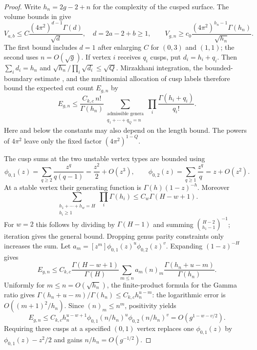 \begin{proof}
Write $h_n=2g-2+n$ for the complexity of the cusped surface. The volume bounds in \cite[Lemmas~18--19]{SW} give
\[
 V_{a,b}\le C\frac{(4\pi^2)^{d-1}\Gamma(d)}{\sqrt d},
 \quad d=2a-2+b\ge1,\qquad
 V_{g,n}\ge c_0\frac{(4\pi^2)^{h_n-1}\Gamma(h_n)}{\sqrt{h_n}}.
\]
The first bound includes $d=1$ after enlarging $C$ for $(0,3)$ and
$(1,1)$; the second uses $n=O(\sqrt g)$. If vertex $i$ receives
$q_i$ cusps, put $d_i=h_i+q_i$. Then $\sum_i d_i=h_n$ and
$\sqrt{h_n}/\prod_i\sqrt{d_i}\le\sqrt Q$. Mirzakhani integration,
the bounded-boundary estimate \cite[Lemma~3.2]{Mir}, and the
multinomial allocation of cusp labels therefore bound the expected
cut count $E_{g,n}$ by
\[
 E_{g,n}\le\frac{C_{k,c}\,n!}{\Gamma(h_n)}
       \sum_{\substack{\text{admissible genera}\\q_1+\cdots+q_Q=n}}
       \prod_i\frac{\Gamma(h_i+q_i)}{q_i!}.
\]
Here and below the constants may also depend on the length bound.
The powers of $4\pi^2$ leave only the fixed factor $(4\pi^2)^{1-Q}$.

The cusp sums at the two unstable vertex types are bounded using
\begin{equation}
 \phi_{0,1}(z)=\sum_{q\ge2}\frac{z^q}{q(q-1)}=\frac{z^2}{2}+O(z^3),
 \qquad \phi_{0,2}(z)=\sum_{q\ge1}\frac{z^q}{q}=z+O(z^2).
 \label{eq:cluster-unstable}
\end{equation}
At a stable vertex their generating function is
$\Gamma(h)(1-z)^{-h}$. Moreover
\[
 \sum_{\substack{h_1+\cdots+h_w=H\\h_i\ge1}}
       \prod_i\Gamma(h_i)\le C_w\Gamma(H-w+1).
\]
For $w=2$ this follows by dividing by $\Gamma(H-1)$ and summing
$\binom{H-2}{h_1-1}^{-1}$; iteration gives the general bound.
Dropping genus parity constraints only increases the sum.
Let $a_m=[z^m]\phi_{0,1}(z)^u\phi_{0,2}(z)^v$. Expanding $(1-z)^{-H}$ gives
\[
 E_{g,n}\le C_{k,c}\frac{\Gamma(H-w+1)}{\Gamma(H)}
       \sum_{m\le n}a_m(n)_m\frac{\Gamma(h_n+u-m)}{\Gamma(h_n)}.
\]
Uniformly for $m\le n=O(\sqrt{h_n})$, the finite-product formula for
the Gamma ratio gives
$\Gamma(h_n+u-m)/\Gamma(h_n)\le C_{k,c}h_n^{u-m}$: the logarithmic
error is $O((m+1)^2/h_n)$. Since $(n)_m\le n^m$, positivity yields
\begin{equation}
 E_{g,n}\le C_{k,c}h_n^{u-w+1}\phi_{0,1}(n/h_n)^u\phi_{0,2}(n/h_n)^v
          =O(g^{1-w-v/2}).
 \label{eq:critical-graph-bound}
\end{equation}
Requiring three cusps at a specified $(0,1)$ vertex replaces one
$\phi_{0,1}(z)$ by $\phi_{0,1}(z)-z^2/2$ and gains $n/h_n=O(g^{-1/2})$.
\end{proof}

